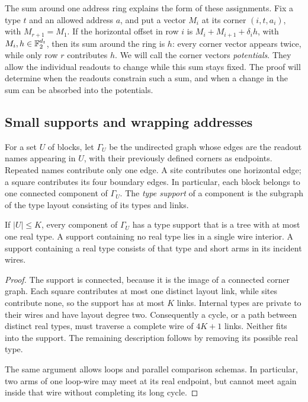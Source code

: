 The sum around one address ring explains the form of these assignments.
Fix a type $t$ and an allowed address $a$, and put a vector $M_i$ at its
corner $(i,t,a_i)$, with $M_{r+1}=M_1$. If the horizontal offset in row $i$ is
$M_i+M_{i+1}+\delta_i h$, with $M_i,h\in\mathbb F_2^{d_t}$, then its sum around
the ring is $h$: every corner vector appears twice, while only row $r$
contributes $h$. We will call the corner vectors \emph{potentials}.
They allow the individual readouts to change while this sum stays fixed.
The proof will determine when the readouts constrain such a sum, and
when a change in the sum can be absorbed into the potentials.

\subsection{Small supports and wrapping addresses}

For a set $U$ of blocks, let $\Gamma_U$ be the undirected graph whose
edges are the readout names appearing in $U$, with their previously
defined corners as endpoints. Repeated names contribute only one edge.
A site contributes one horizontal edge; a square contributes its four
boundary edges. In particular, each block belongs to one connected
component of $\Gamma_U$. The \emph{type support} of a component is the
subgraph of the type layout consisting of its types and links.

\begin{lemma}
\label{lem:small-type-support}
If $|U|\leq K$, every component of $\Gamma_U$ has a type support that
is a tree with at most one real type. A support containing no real type
lies in a single wire interior. A support containing a real type consists
of that type and short arms in its incident wires.
\end{lemma}

\begin{proof}
The support is connected, because it is the image of a connected corner
graph. Each square contributes at most one distinct layout link, while
sites contribute none, so the support has at most $K$ links. Internal
types are private to their wires and have layout degree two. Consequently
a cycle, or a path between distinct real types, must traverse a complete
wire of $4K+1$ links. Neither fits into the support. The remaining
description follows by removing its possible real type.

The same argument allows loops and parallel comparison schemas. In
particular, two arms of one loop-wire may meet at its real endpoint, but
cannot meet again inside that wire without completing its long cycle.
\end{proof}

